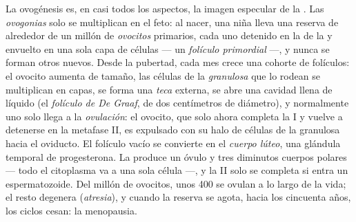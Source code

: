 \begin{definition}\label{def:b2:mammal-reproduction:ovary}
La ovogénesis es, en casi todos los aspectos, la imagen especular de la
. Las \emph{ovogonias} solo se multiplican en el feto: al
nacer, una niña lleva una reserva de alrededor de un millón de
\emph{ovocitos} primarios, cada uno detenido en la  de la
 y envuelto en una sola capa de células --- un \emph{folículo
primordial} ---, y nunca se forman otros nuevos. Desde la pubertad, cada
mes crece una cohorte de folículos: el ovocito aumenta de tamaño, las
células de la \emph{granulosa} que lo rodean se multiplican en capas, se
forma una \emph{teca} externa, se abre una cavidad llena de líquido (el
\emph{folículo de De Graaf}, de dos centímetros de diámetro), y
normalmente uno solo llega a la \emph{ovulación}: el ovocito, que solo
ahora completa la  I y vuelve a detenerse en la metafase II, es
expulsado con su halo de células de la granulosa hacia el oviducto. El
folículo vacío se convierte en el \emph{cuerpo lúteo}, una glándula
temporal de progesterona. La  produce un óvulo y tres diminutos
cuerpos polares --- todo el citoplasma va a una sola célula ---, y la
 II solo se completa si entra un espermatozoide. Del millón de
ovocitos, unos \num{400} se ovulan a lo largo de la vida; el resto
degenera (\emph{atresia}), y cuando la reserva se agota, hacia los
cincuenta años, los ciclos cesan: la menopausia.
\end{definition}

